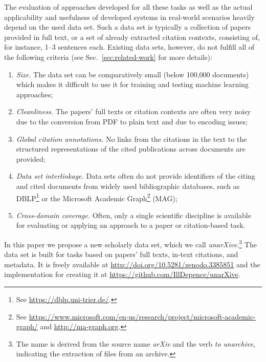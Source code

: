 The evaluation of approaches developed for all these tasks as well as the actual applicability and usefulness of developed systems in real-world scenarios heavily depend on the used data set. Such a data set is typically a collection of papers provided in full text, or a set of already extracted citation contexts, consisting of, for instance, 1--3 sentences each. Existing data sets, however, do not fulfill all of the following criteria  (see Sec.~\ref{sec:related-work} for more details):
\begin{enumerate}
 \item \textit{Size.} The data set can be comparatively small (below 100,000 documents) which makes it difficult to use it for training and testing machine learning approaches; 
 \item \textit{Cleanliness.} The papers' full texts or citation contexts are often very noisy due to the conversion from PDF to plain text and due to encoding issues;
 \item \textit{Global citation annotations.} No links from the citations in the text to the structured representations of the cited publications across documents are provided;
 \item \textit{Data set interlinkage.} Data sets often do not provide identifiers of the citing and cited documents from widely used bibliographic databases, such as DBLP\footnote{See \url{https://dblp.uni-trier.de/}.} or the Microsoft Academic Graph\footnote{See \url{https://www.microsoft.com/en-us/research/project/microsoft-academic-graph/} and \url{http://ma-graph.org}.} (MAG);
 \item \textit{Cross-domain coverage.} Often, only a single scientific discipline is available for evaluating or applying an approach to a paper or citation-based task.
\end{enumerate}

In this paper we propose a new scholarly data set, which we call \emph{unarXive}.\footnote{The name is derived from the source name \emph{arXiv} and the verb \textit{to unarchive}, indicating the extraction of files from an archive.} The data set is built for tasks based on papers' full texts, in-text citations, and metadata.
It is freely available at \url{http://doi.org/10.5281/zenodo.3385851} and the implementation for creating it at \url{https://github.com/IllDepence/unarXive}. 

